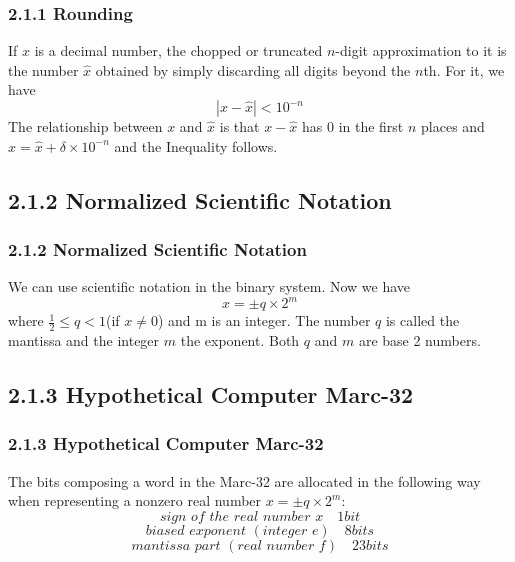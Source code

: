 \documentclass[notheorems,mathserif,table,compress]{beamer}  %
\begin{document}
\begin{frame}
  \frametitle{2.1.1 Rounding}
  If $x$ is a decimal number, the chopped or truncated $n$-digit approximation to it is the number $\widehat{x}$ obtained by simply discarding all digits beyond the $n$th. For it, we have
  \begin{displaymath}
  |x-\widehat{x}|<10^{-n}
  \end{displaymath}
  The relationship between $x$ and $\widehat{x}$ is that $x-\widehat{x}$ has 0 in the first $n$ places and $x=\widehat{x}+\delta \times 10^{-n}$ and the Inequality follows.
\end{frame}



\subsection{2.1.2 Normalized Scientific Notation}

\begin{frame}
  \frametitle{2.1.2 Normalized Scientific Notation}
  We can use scientific notation in the binary system. Now we have
  \[x=\pm q \times 2^m\]
  where $\frac{1}{2} \le q < 1$(if $x \ne 0$) and m is an integer.
  The number $q$ is called the mantissa and the integer $m$ the exponent. Both $q$ and $m$ are base 2 numbers.
\end{frame}


\subsection{2.1.3 Hypothetical Computer Marc-32}

\begin{frame}
  \frametitle{2.1.3 Hypothetical Computer Marc-32}
  The bits composing a word in the Marc-32 are allocated in the following way when representing a nonzero real number $x=\pm q \times 2^m$:
  \begin{displaymath}
  sign\,\, of\,\, the\,\, real\,\, number\,\, x \quad 1 bit
  \end{displaymath}
  \begin{displaymath}
  biased\,\, exponent\,\, (integer\,\, e) \quad 8 bits
  \end{displaymath}
  \begin{displaymath}
  mantissa\,\, part\,\, (real\,\, number\,\, f) \quad 23 bits
  \end{displaymath}
\end{frame}
\end{document}

